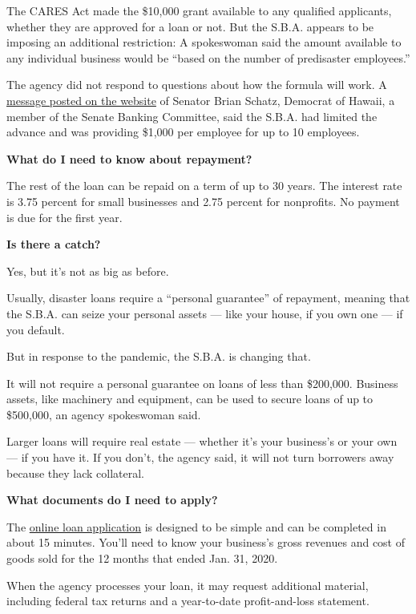 The CARES Act made the \$10,000 grant available to any qualified
applicants, whether they are approved for a loan or not. But the S.B.A.
appears to be imposing an additional restriction: A spokeswoman said the
amount available to any individual business would be ``based on the
number of predisaster employees.''

The agency did not respond to questions about how the formula will work.
A
\href{https://www.schatz.senate.gov/coronavirus/small-businesses/sba-economic-injury-disaster-loan-and-emergency-grant}{message
posted on the website} of Senator Brian Schatz, Democrat of Hawaii, a
member of the Senate Banking Committee, said the S.B.A. had limited the
advance and was providing \$1,000 per employee for up to 10 employees.

\textbf{What do I need to know about repayment?}

The rest of the loan can be repaid on a term of up to 30 years. The
interest rate is 3.75 percent for small businesses and 2.75 percent for
nonprofits. No payment is due for the first year.

\textbf{Is there a catch?}

Yes, but it's not as big as before.

Usually, disaster loans require a ``personal guarantee'' of repayment,
meaning that the S.B.A. can seize your personal assets --- like your
house, if you own one --- if you default.

But in response to the pandemic, the S.B.A. is changing that.

It will not require a personal guarantee on loans of less than
\$200,000. Business assets, like machinery and equipment, can be used to
secure loans of up to \$500,000, an agency spokeswoman said.

Larger loans will require real estate --- whether it's your business's
or your own --- if you have it. If you don't, the agency said, it will
not turn borrowers away because they lack collateral.

\textbf{What documents do I need to apply?}

The \href{https://covid19relief.sba.gov/\#/}{online loan application} is
designed to be simple and can be completed in about 15 minutes. You'll
need to know your business's gross revenues and cost of goods sold for
the 12 months that ended Jan. 31, 2020.

When the agency processes your loan, it may request additional material,
including federal tax returns and a year-to-date profit-and-loss
statement.

